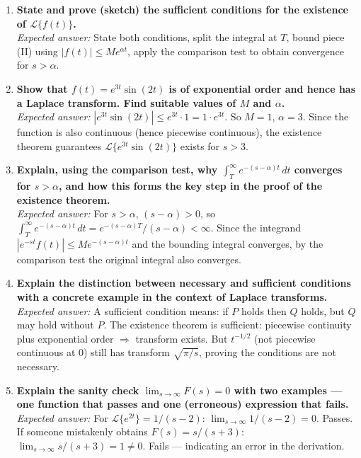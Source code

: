 \documentclass[12pt,a4paper]{article}
\begin{document}
\begin{enumerate}[label=\textbf{D\arabic*.}]

\item \textbf{State and prove (sketch) the sufficient conditions for the existence of
$\mathcal{L}\{f(t)\}$.} \\
\textit{Expected answer:} State both conditions, split the integral at $T$, bound piece (II)
using $|f(t)| \leq M e^{\alpha t}$, apply the comparison test to obtain convergence for $s > \alpha$.

\item \textbf{Show that $f(t) = e^{3t} \sin(2t)$ is of exponential order and hence has a Laplace
transform. Find suitable values of $M$ and $\alpha$.} \\
\textit{Expected answer:} $|e^{3t} \sin(2t)| \leq e^{3t} \cdot 1 = 1 \cdot e^{3t}$.
So $M = 1$, $\alpha = 3$. Since the function is also continuous (hence piecewise continuous),
the existence theorem guarantees $\mathcal{L}\{e^{3t}\sin(2t)\}$ exists for $s > 3$.

\item \textbf{Explain, using the comparison test, why $\int_T^\infty e^{-(s-\alpha)t}\, dt$
converges for $s > \alpha$, and how this forms the key step in the proof of the existence
theorem.} \\
\textit{Expected answer:} For $s > \alpha$, $(s-\alpha) > 0$, so
$\int_T^\infty e^{-(s-\alpha)t}\, dt = e^{-(s-\alpha)T}/(s-\alpha) < \infty$.
Since the integrand $|e^{-st} f(t)| \leq M e^{-(s-\alpha)t}$ and the bounding integral
converges, by the comparison test the original integral also converges.

\item \textbf{Explain the distinction between necessary and sufficient conditions with a concrete
example in the context of Laplace transforms.} \\
\textit{Expected answer:} A sufficient condition means: if $P$ holds then $Q$ holds, but $Q$
may hold without $P$. The existence theorem is sufficient: piecewise continuity plus exponential
order $\Rightarrow$ transform exists. But $t^{-1/2}$ (not piecewise continuous at 0) still has
transform $\sqrt{\pi/s}$, proving the conditions are not necessary.

\item \textbf{Explain the sanity check $\lim_{s \to \infty} F(s) = 0$ with two examples --- one
function that passes and one (erroneous) expression that fails.} \\
\textit{Expected answer:} For $\mathcal{L}\{e^{2t}\} = 1/(s-2)$:
$\lim_{s\to\infty} 1/(s-2) = 0$. Passes.
If someone mistakenly obtains $F(s) = s/(s+3)$:
$\lim_{s\to\infty} s/(s+3) = 1 \neq 0$. Fails --- indicating an error in the derivation.

\end{enumerate}
\end{document}

